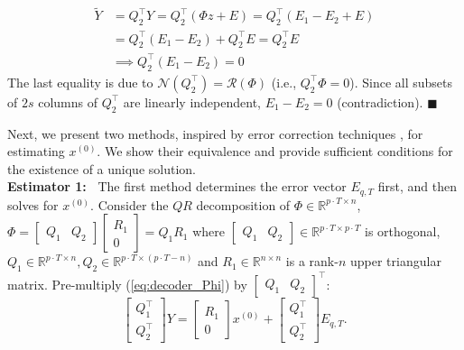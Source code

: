 \documentclass[../../thesis.tex]{subfiles}
\begin{document}
\begin{equation}
\begin{aligned}
	\tilde Y &= Q_2^\top Y =  Q_2^\top (\Phi z+E) =  Q_2^\top (E_1 - E_2 + E  ) \\
	& =  Q_2^\top(E_1-E_2) +  Q_2^\top E =  Q_2^\top E \\
	& \implies  Q_2^\top (E_1-E_2) = 0 \nonumber 
\end{aligned}
\end{equation}
The last equality is due to $\mathcal{N}(Q_2^\top) = \mathcal{R}(\Phi)$ (i.e., $Q_2^\top \Phi = 0$). Since all subsets of $2s$ columns of $Q_2^\top$ are linearly independent, $E_1 - E_2 = 0 $ (contradiction). \hfill$\blacksquare$


Next, we present two methods, inspired by error correction techniques \cite{Candes_Tao}\cite{David_Chang}, for estimating $x^{(0)}$. We show their equivalence and provide sufficient conditions for the existence of a unique solution.\\
{\bf Estimator 1:~} The first method determines the error vector $E_{q,T}$ first, and then solves for $x^{(0)}$. 
Consider the $QR$ decomposition \cite{QRdecomp} of $\Phi \in \mathbb{R}^{p\cdot T \times n}$,
$	\Phi = \begin{bmatrix} Q_1 & Q_2 \end{bmatrix} \begin{bmatrix} R_1 \\ 0 \end{bmatrix} = Q_1 R_1 $
where $\begin{bmatrix} Q_1 & Q_2 \end{bmatrix} \in \mathbb{R}^{p\cdot T \times p\cdot T}$ is orthogonal, $Q_1 \in \mathbb{R}^{p\cdot T\times n}, Q_2 \in \mathbb{R}^{p\cdot T \times (p\cdot T-n)}$ and $R_1 \in \mathbb{R}^{n\times n}$ is a rank-$n$ upper triangular matrix. Pre-multiply (\ref{eq:decoder_Phi}) by $\begin{bmatrix} Q_1 & Q_2 \end{bmatrix} ^\top$:
\begin{equation}
	\begin{bmatrix} Q_1 ^\top \\ Q_2 ^\top \end{bmatrix} Y = \begin{bmatrix}R_1 \\ 0  \end{bmatrix} x^{(0)} + \begin{bmatrix} Q_1 ^\top \\ Q_2^\top \end{bmatrix} E_{q,T}.
	\label{eq:QR}
\end{equation}
\end{document}
